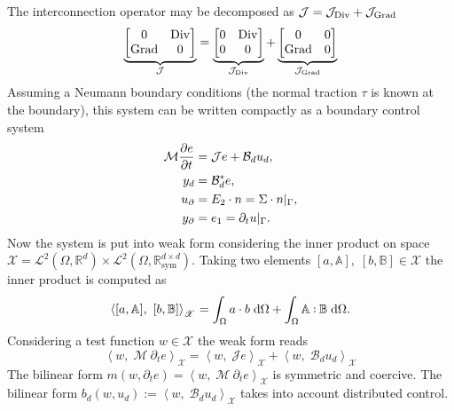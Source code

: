 The interconnection operator may be decomposed as $\mathcal{J} = \mathcal{J}_{\operatorname*{Div}} + \mathcal{J}_{\operatorname*{Grad}}$
\begin{equation}
\underbrace{\begin{bmatrix}
	0 & \operatorname*{Div} \\ \operatorname*{Grad} & 0 \\
	\end{bmatrix}}_{\mathcal{J}} = 
\underbrace{\begin{bmatrix}
	0 & \operatorname*{Div} \\ 0  & 0 \\
	\end{bmatrix}}_{\mathcal{J}_{\operatorname*{Div}}} + 
\underbrace{\begin{bmatrix}
	0 & 0 \\ \operatorname*{Grad} & 0 \\
	\end{bmatrix}}_{\mathcal{J}_{\operatorname*{Grad}}}
\end{equation}
Assuming a Neumann boundary conditions (the normal traction $\tau$ is known at the boundary),
this system can be written compactly as a boundary control system
\begin{equation}
\label{eq:eldyn_PDE}
\begin{aligned}
\mathcal{M} \diffp{e}{t} &= \mathcal{J} e + \mathcal{B}_d u_d, \\
y_d &= \mathcal{B}_d^* e, \\
u_\partial &= E_2 \cdot n = \Sigma \cdot n|_{\Gamma}, \\
y_\partial &= e_1 = \partial_t u|_{\Gamma}.
\end{aligned}
\end{equation}
Now the system is put into weak form considering the inner product on space $\mathscr{X} = \mathscr{L}^2(\Omega, \mathbb{R}^d) \times \mathscr{L}^2(\Omega, \mathbb{R}^{d\times d}_{\text{sym}})$. Taking two elements $[a, \mathbb{A}], \; [b, \mathbb{B}] \in \mathscr{X}$ the inner product is computed as
\[
\left\langle [a, \mathbb{A}], \ [b, \mathbb{B}] \right\rangle_{\mathscr{X}} = \int_{\Omega} a \cdot b \d{\Omega} + \int_{\Omega} \mathbb{A} \cddot \mathbb{B} \d{\Omega}.
\]
Considering a test function $w \in \mathscr{X}$ the weak form reads
\begin{equation*}
\left\langle w, \; \mathcal{M} \ \partial_t e \right\rangle_{\mathscr{X}} = \left\langle w, \; \mathcal{J} e \right\rangle_{\mathscr{X}} + \left\langle w, \; \mathcal{B}_d u_d \right\rangle_{\mathscr{X}}
\end{equation*}
The bilinear form $m(w, \partial_t e) = \left\langle w, \; \mathcal{M} \ \partial_t e \right\rangle_{\mathscr{X}}$ is symmetric and coercive. The bilinear form $b_d(w, u_d):=\left\langle w, \; \mathcal{B}_d u_d \right\rangle_{\mathscr{X}}$ takes into account distributed control.\\
